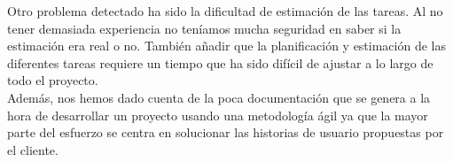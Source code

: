 \documentclass[11pt]{article}
\begin{document}
Otro problema detectado ha sido la dificultad de estimación de las tareas. Al no tener demasiada experiencia no teníamos mucha seguridad en saber si la estimación era real o no. También añadir que la planificación y estimación de las diferentes tareas requiere un tiempo que ha sido difícil de ajustar a lo largo de todo el proyecto. \\

Además, nos hemos dado cuenta de la poca documentación que se genera a la hora de desarrollar un proyecto usando una metodología ágil ya que la mayor parte del esfuerzo se centra en solucionar las historias de usuario propuestas por el cliente.
\end{document}
